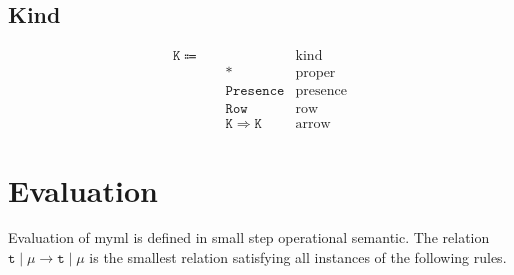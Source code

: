 \documentclass{report}
\newcommand{\theLang}{myml}
\newcommand{\code}{\mathtt}
\begin{document}
\subsection{Kind}

\begin{align*}
\code{K} \Coloneqq \quad & & \text{kind} \\
& \code{*} & \text{proper} \\
& \code{Presence} & \text{presence} \\
& \code{Row} & \text{row} \\
& \code{K \Rightarrow K} & \text{arrow}
\end{align*}

\section{Evaluation}

Evaluation of \theLang{} is defined in small step operational semantic. The relation \(\code{t}\mid\mu \longrightarrow \code{t}\mid\mu\) is the smallest relation satisfying all instances of the following rules.
\end{document}
